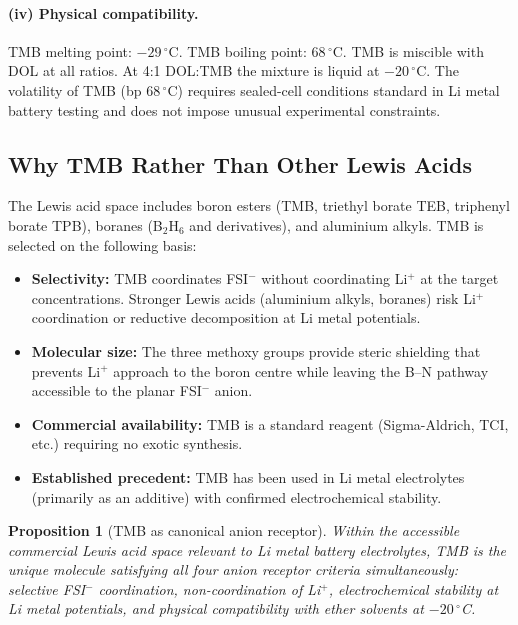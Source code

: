 \documentclass[11pt]{article}
\theoremstyle{plain}
\newtheorem{proposition}[theorem]{Proposition}
\theoremstyle{definition}
\theoremstyle{remark}
\begin{document}
\paragraph{(iv) Physical compatibility.}
TMB melting point: $-29\,^\circ$C.  TMB boiling point: $68\,^\circ$C.
TMB is miscible with DOL at all ratios.  At 4:1 DOL:TMB the mixture
is liquid at $-20\,^\circ$C.  The volatility of TMB (bp $68\,^\circ$C)
requires sealed-cell conditions standard in Li metal battery testing
and does not impose unusual experimental constraints.

\subsection{Why TMB Rather Than Other Lewis Acids}

The Lewis acid space includes boron esters (TMB, triethyl borate TEB,
triphenyl borate TPB), boranes (B$_2$H$_6$ and derivatives), and
aluminium alkyls.  TMB is selected on the following basis:

\begin{itemize}[leftmargin=2em]
  \item \textbf{Selectivity:} TMB coordinates FSI$^-$ without
        coordinating Li$^+$ at the target concentrations.  Stronger
        Lewis acids (aluminium alkyls, boranes) risk Li$^+$ coordination
        or reductive decomposition at Li metal potentials.
  \item \textbf{Molecular size:} The three methoxy groups provide
        steric shielding that prevents Li$^+$ approach to the boron
        centre while leaving the B--N pathway accessible to the planar
        FSI$^-$ anion.
  \item \textbf{Commercial availability:} TMB is a standard reagent
        (Sigma-Aldrich, TCI, etc.) requiring no exotic synthesis.
  \item \textbf{Established precedent:} TMB has been used in Li metal
        electrolytes (primarily as an additive) with confirmed
        electrochemical stability.
\end{itemize}

\begin{proposition}[TMB as canonical anion receptor]
Within the accessible commercial Lewis acid space relevant to Li metal
battery electrolytes, TMB is the unique molecule satisfying all four
anion receptor criteria simultaneously:
selective FSI$^-$ coordination, non-coordination of Li$^+$,
electrochemical stability at Li metal potentials, and physical
compatibility with ether solvents at $-20\,^\circ$C.
\end{proposition}
\end{document}
